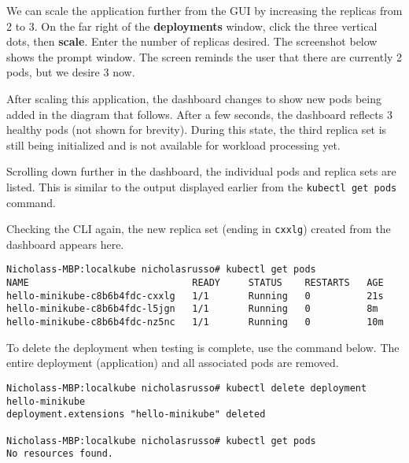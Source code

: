 
We can scale the application further from the GUI by increasing the replicas
from 2 to 3. On the far right of the \textbf{deployments} window, click the
three vertical dots, then \textbf{scale}. Enter the number of replicas
desired. The screenshot below shows the prompt window. The screen reminds the
user that there are currently 2 pods, but we desire 3 now.


After scaling this application, the dashboard changes to show new pods being
added in the diagram that follows. After a few seconds, the dashboard reflects 3
healthy pods (not shown for brevity). During this state, the third replica set
is still being initialized and is not available for workload processing yet.



Scrolling down further in the dashboard, the individual pods and replica sets
are listed. This is similar to the output displayed earlier from the
\verb|kubectl get pods| command.


Checking the CLI again, the new replica set (ending in \verb|cxxlg|) created
from the dashboard appears here.

\begin{verbatim}
Nicholass-MBP:localkube nicholasrusso# kubectl get pods
NAME                             READY     STATUS    RESTARTS   AGE
hello-minikube-c8b6b4fdc-cxxlg   1/1       Running   0          21s
hello-minikube-c8b6b4fdc-l5jgn   1/1       Running   0          8m
hello-minikube-c8b6b4fdc-nz5nc   1/1       Running   0          10m
\end{verbatim}

To delete the deployment when testing is complete, use the command below. The
entire deployment (application) and all associated pods are removed.

\begin{verbatim}
Nicholass-MBP:localkube nicholasrusso# kubectl delete deployment hello-minikube
deployment.extensions "hello-minikube" deleted

Nicholass-MBP:localkube nicholasrusso# kubectl get pods
No resources found.
\end{verbatim}

